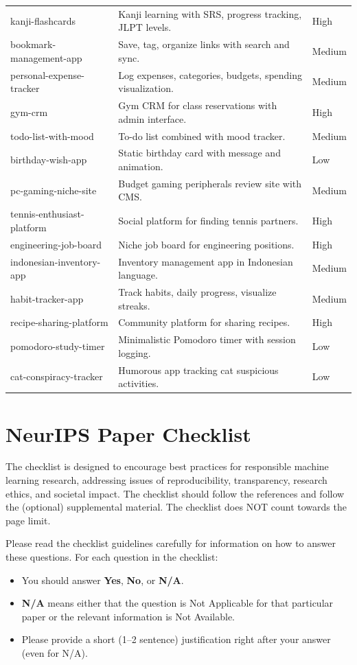 \documentclass{article}
\begin{document}
\begin{table}[h]
\begin{tabular}{p{3cm}p{8cm}p{1.5cm}}
kanji-flashcards & Kanji learning with SRS, progress tracking, JLPT levels. & High \\
bookmark-management-app & Save, tag, organize links with search and sync. & Medium \\
personal-expense-tracker & Log expenses, categories, budgets, spending visualization. & Medium \\
gym-crm & Gym CRM for class reservations with admin interface. & High \\
todo-list-with-mood & To-do list combined with mood tracker. & Medium \\
birthday-wish-app & Static birthday card with message and animation. & Low \\
pc-gaming-niche-site & Budget gaming peripherals review site with CMS. & Medium \\
tennis-enthusiast-platform & Social platform for finding tennis partners. & High \\
engineering-job-board & Niche job board for engineering positions. & High \\
indonesian-inventory-app & Inventory management app in Indonesian language. & Medium \\
habit-tracker-app & Track habits, daily progress, visualize streaks. & Medium \\
recipe-sharing-platform & Community platform for sharing recipes. & High \\
pomodoro-study-timer & Minimalistic Pomodoro timer with session logging. & Low \\
cat-conspiracy-tracker & Humorous app tracking cat suspicious activities. & Low \\
\bottomrule
\end{tabular}
\end{table}


\newpage
\section*{NeurIPS Paper Checklist}

The checklist is designed to encourage best practices for responsible machine learning research, addressing issues of reproducibility, transparency, research ethics, and societal impact. The checklist should follow the references and follow the (optional) supplemental material. The checklist does NOT count towards the page limit.

Please read the checklist guidelines carefully for information on how to answer these questions. For each question in the checklist:
\begin{itemize}
    \item You should answer \textbf{Yes}, \textbf{No}, or \textbf{N/A}.
    \item \textbf{N/A} means either that the question is Not Applicable for that particular paper or the relevant information is Not Available.
    \item Please provide a short (1--2 sentence) justification right after your answer (even for N/A).
\end{itemize}
\end{document}
